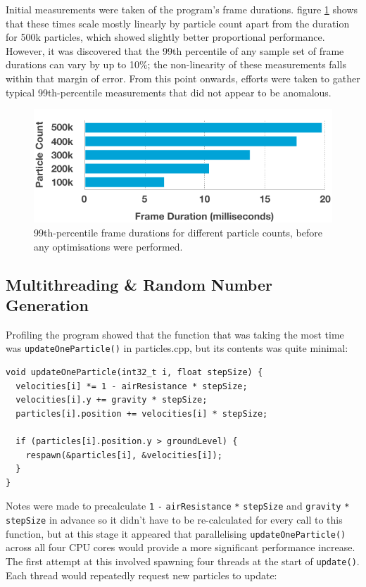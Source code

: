\documentclass[11pt, a4paper, twocolumn]{article}
\begin{document}
Initial measurements were taken of the program's frame durations. figure \ref{fig:initialtimes} shows that these times scale mostly linearly by particle count apart from the duration for 500k particles, which showed slightly better proportional performance. However, it was discovered that the 99th percentile of any sample set of frame durations can vary by up to 10\%; the non-linearity of these measurements falls within that margin of error. From this point onwards, efforts were taken to gather typical 99th-percentile measurements that did not appear to be anomalous.

\begin{figure}[h]
\includegraphics[width=\linewidth]{initialtimes}
\caption{99th-percentile frame durations for different particle counts, before any optimisations were performed.}
\label{fig:initialtimes}
\end{figure}

\subsection{Multithreading \& Random Number Generation} \label{sec:multithread}

Profiling the program showed that the function that was taking the most time was \verb|updateOneParticle()| in particles.cpp, but its contents was quite minimal:

\begin{verbatim}
void updateOneParticle(int32_t i, float stepSize) {
  velocities[i] *= 1 - airResistance * stepSize;
  velocities[i].y += gravity * stepSize;
  particles[i].position += velocities[i] * stepSize;

  if (particles[i].position.y > groundLevel) {
    respawn(&particles[i], &velocities[i]);
  }
}
\end{verbatim}

Notes were made to precalculate \verb|1| \verb|-| \verb|airResistance| \verb|*| \verb|stepSize| and \verb|gravity| \verb|*| \verb|stepSize| in advance so it didn't have to be re-calculated for every call to this function, but at this stage it appeared that parallelising \verb|updateOneParticle()| across all four CPU cores would provide a more significant performance increase. The first attempt at this involved spawning four threads at the start of \verb|update()|. Each thread would repeatedly request new particles to update:
\end{document}
